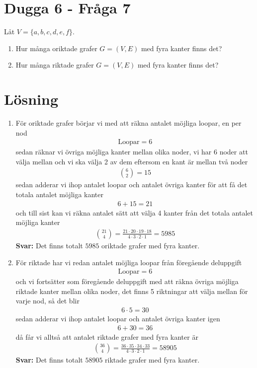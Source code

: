 \documentclass[a4paper,12pt]{article}
\begin{document}
%
\section{Dugga 6 - Fråga 7}
Låt $V = \{a, b, c, d, e, f\}$.
\begin{enumerate}[label=\alph*)]
    \item Hur många oriktade grafer $G = (V,E)$ med fyra kanter finns det?
    \item Hur många riktade grafer $G = (V,E)$ med fyra kanter finns det?
\end{enumerate}
%
\section*{Lösning}
%
\begin{enumerate}[label=\alph*)]
    \item För oriktade grafer börjar vi med att räkna antalet möjliga loopar,
    en per nod
    \begin{align}
        \text{Loopar} = 6
    \end{align}
    sedan räknar vi övriga möjliga kanter mellan olika noder, vi har 6 noder
    att välja mellan och vi ska välja 2 av dem eftersom en kant är mellan två
    noder
    \begin{align}
        \binom{6}{2} = 15
    \end{align}
    sedan adderar vi ihop antalet loopar och antalet övriga kanter för att få
    det totala antalet möjliga kanter
    \begin{align}
        6 + 15 = 21
    \end{align}
    och till sist kan vi räkna antalet sätt att välja 4 kanter från det totala
    antalet möjliga kanter
    \begin{align}
        \binom{21}{4} = \frac{21 \cdot 20 \cdot 19 \cdot 18}{4 \cdot 3 \cdot 2 \cdot 1} = 5985
    \end{align}
    \textbf{Svar:} Det finns totalt $5985$ oriktade grafer med fyra
    kanter.
    \item För riktade har vi redan antalet möjliga loopar från föregående
    deluppgift
    \begin{align}
        \text{Loopar} = 6
    \end{align}
    och vi fortsätter som föregående deluppgift med att räkna övriga möjliga
    riktade kanter mellan olika noder, det finns 5 riktningar att välja mellan
    för varje nod, så det blir
    \begin{align}
        6 \cdot 5 = 30
    \end{align}
    sedan adderar vi ihop antalet loopar och antalet övriga kanter igen
    \begin{align}
        6 + 30 = 36
    \end{align}
    då får vi alltså att antalet riktade grafer med fyra kanter är
    \begin{align}
        \binom{36}{4} = \frac{36 \cdot 35 \cdot 34 \cdot 33}{4 \cdot 3 \cdot 2 \cdot 1} = 58905
    \end{align}
    \textbf{Svar:} Det finns totalt $58905$ riktade grafer med fyra kanter.
\end{enumerate}
\end{document}

